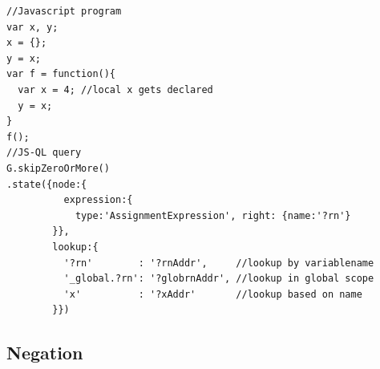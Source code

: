 \begin{lstlisting}[label={lst:lookup},language=JSQL, caption=Looking up addresses in JS-QL,mathescape=true]
//Javascript program
var x, y;
x = {};
y = x;
var f = function(){
  var x = 4; //local x gets declared
  y = x;
}
f();
//JS-QL query
G.skipZeroOrMore()
.state({node:{
          expression:{
            type:'AssignmentExpression', right: {name:'?rn'}
        }},
        lookup:{
          '?rn'        : '?rnAddr',     //lookup by variablename
          '_global.?rn': '?globrnAddr', //lookup in global scope
          'x'          : '?xAddr'       //lookup based on name
        }})
\end{lstlisting}



\subsection{Negation}

